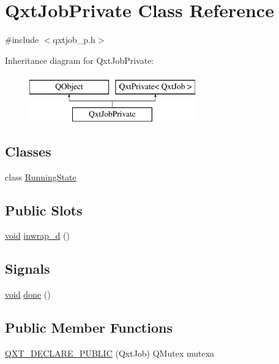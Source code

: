 \hypertarget{class_qxt_job_private}{\section{Qxt\-Job\-Private Class Reference}
\label{class_qxt_job_private}
}


{\ttfamily \#include $<$qxtjob\-\_\-p.\-h$>$}

Inheritance diagram for Qxt\-Job\-Private\-:\begin{figure}[H]
\begin{center}
\leavevmode
\includegraphics[height=2.000000cm]{class_qxt_job_private}
\end{center}
\end{figure}
\subsection*{Classes}
\begin{DoxyCompactItemize}
\item 
class \hyperlink{class_qxt_job_private_1_1_running_state}{Running\-State}
\end{DoxyCompactItemize}
\subsection*{Public Slots}
\begin{DoxyCompactItemize}
\item 
\hyperlink{group___u_a_v_objects_plugin_ga444cf2ff3f0ecbe028adce838d373f5c}{void} \hyperlink{class_qxt_job_private_a943f6f5086d22c1b140789582e1623f9}{inwrap\-\_\-d} ()
\end{DoxyCompactItemize}
\subsection*{Signals}
\begin{DoxyCompactItemize}
\item 
\hyperlink{group___u_a_v_objects_plugin_ga444cf2ff3f0ecbe028adce838d373f5c}{void} \hyperlink{class_qxt_job_private_a271c903d70dcdc9a3673a7934765910d}{done} ()
\end{DoxyCompactItemize}
\subsection*{Public Member Functions}
\begin{DoxyCompactItemize}
\item 
\hyperlink{class_qxt_job_private_a34438e8ae612e1f7d69165e9ecc1f9d9}{Q\-X\-T\-\_\-\-D\-E\-C\-L\-A\-R\-E\-\_\-\-P\-U\-B\-L\-I\-C} (Qxt\-Job) Q\-Mutex mutexa
\end{DoxyCompactItemize}
